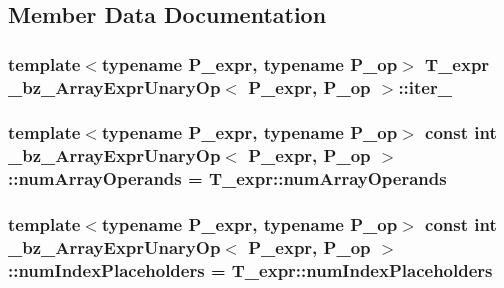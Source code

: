 \subsection{Member Data Documentation}
\hypertarget{class__bz__ArrayExprUnaryOp_aed2267d7026324bc825edab2463adb1b}{}
\subsubsection[{iter\+\_\+}]{\setlength{\rightskip}{0pt plus 5cm}template$<$typename P\+\_\+expr, typename P\+\_\+op$>$ {\bf T\+\_\+expr} {\bf \+\_\+bz\+\_\+\+Array\+Expr\+Unary\+Op}$<$ P\+\_\+expr, P\+\_\+op $>$\+::iter\+\_\+\hspace{0.3cm}{\ttfamily [protected]}}\label{class__bz__ArrayExprUnaryOp_aed2267d7026324bc825edab2463adb1b}
\hypertarget{class__bz__ArrayExprUnaryOp_a045c62331f2ffbee4d7ab1ae85cb9d9e}{}
\subsubsection[{num\+Array\+Operands}]{\setlength{\rightskip}{0pt plus 5cm}template$<$typename P\+\_\+expr, typename P\+\_\+op$>$ const int {\bf \+\_\+bz\+\_\+\+Array\+Expr\+Unary\+Op}$<$ P\+\_\+expr, P\+\_\+op $>$\+::num\+Array\+Operands = T\+\_\+expr\+::num\+Array\+Operands\hspace{0.3cm}{\ttfamily [static]}}\label{class__bz__ArrayExprUnaryOp_a045c62331f2ffbee4d7ab1ae85cb9d9e}
\hypertarget{class__bz__ArrayExprUnaryOp_a74abfacc0bb852c8efd879b2e8a4ea77}{}
\subsubsection[{num\+Index\+Placeholders}]{\setlength{\rightskip}{0pt plus 5cm}template$<$typename P\+\_\+expr, typename P\+\_\+op$>$ const int {\bf \+\_\+bz\+\_\+\+Array\+Expr\+Unary\+Op}$<$ P\+\_\+expr, P\+\_\+op $>$\+::num\+Index\+Placeholders = T\+\_\+expr\+::num\+Index\+Placeholders\hspace{0.3cm}{\ttfamily [static]}}\label{class__bz__ArrayExprUnaryOp_a74abfacc0bb852c8efd879b2e8a4ea77}
\hypertarget{class__bz__ArrayExprUnaryOp_aa736afcc97edc921e07290cb8c822555}{}
